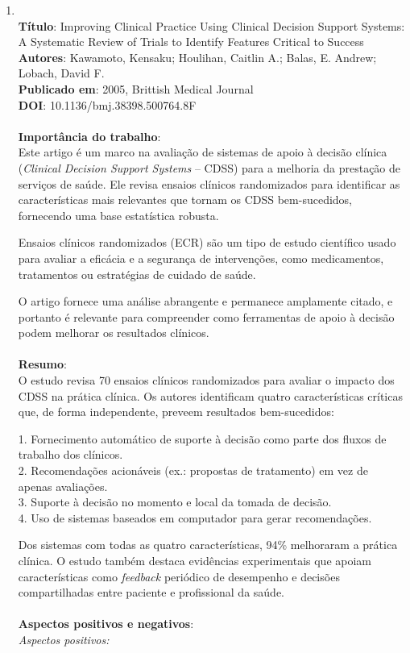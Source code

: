 \documentclass[
	article,
	11pt,
	oneside,
	a4paper,
	english,
	brazil,
	sumario=tradicional
	]{abntex2}
\begin{document}
\begin{enumerate}
\item \cite{kawamoto2005improving}
\\
\textbf{Título}: Improving Clinical Practice Using Clinical Decision Support Systems: A Systematic Review of Trials to Identify Features Critical to Success
\\
\textbf{Autores}: Kawamoto, Kensaku; Houlihan, Caitlin A.; Balas, E. Andrew; Lobach, David F.
\\
\textbf{Publicado em}: 2005, Brittish Medical Journal
\\
\textbf{DOI}: 10.1136/bmj.38398.500764.8F
\\ \\
\textbf{Importância do trabalho}:
\\
Este artigo é um marco na avaliação de sistemas de apoio à decisão clínica (\textit{Clinical Decision Support Systems} -- CDSS) para a melhoria da prestação de serviços de saúde. Ele revisa ensaios clínicos randomizados para identificar as características mais relevantes que tornam os CDSS bem-sucedidos, fornecendo uma base estatística robusta.

Ensaios clínicos randomizados (ECR) são um tipo de estudo científico usado para avaliar a eficácia e a segurança de intervenções, como medicamentos, tratamentos ou estratégias de cuidado de saúde.

O artigo fornece uma análise abrangente e permanece amplamente citado, e portanto é relevante para compreender como ferramentas de apoio à decisão podem melhorar os resultados clínicos.
\\ \\
\textbf{Resumo}:
\\
O estudo revisa 70 ensaios clínicos randomizados para avaliar o impacto dos CDSS na prática clínica. Os autores identificam quatro características críticas que, de forma independente, preveem resultados bem-sucedidos:

1. Fornecimento automático de suporte à decisão como parte dos fluxos de trabalho dos clínicos.\\
2. Recomendações acionáveis (ex.: propostas de tratamento) em vez de apenas avaliações.\\
3. Suporte à decisão no momento e local da tomada de decisão.\\
4. Uso de sistemas baseados em computador para gerar recomendações.

Dos sistemas com todas as quatro características, 94\% melhoraram a prática clínica. O estudo também destaca evidências experimentais que apoiam características como \textit{feedback} periódico de desempenho e decisões compartilhadas entre paciente e profissional da saúde.
\\ \\
\textbf{Aspectos positivos e negativos}:
\\
\textit{Aspectos positivos:}


\end{enumerate}
\end{document}
